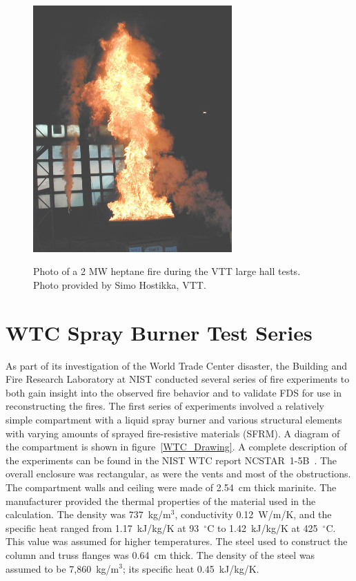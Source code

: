 \begin{figure}[\figoptions{b}]
\begin{center}
\includegraphics[width=3.0in]{FIGURES/VTT/VTT_2MW_fire}\\
\end{center}
\caption{Photo of a 2 MW heptane fire during the VTT large hall tests. Photo provided by Simo Hostikka, VTT.}
 \label{fig:VTT_2MW_fire}
\end{figure}

\clearpage

\section{WTC Spray Burner Test Series}

As part of its investigation of the World Trade Center disaster, the Building and Fire Research Laboratory at NIST conducted several series of fire experiments to both gain insight into the
observed fire behavior and to validate FDS for use in reconstructing the fires. The first series of experiments involved a relatively simple compartment with a liquid spray burner and
various structural elements with varying amounts of sprayed fire-resistive materials (SFRM). A diagram of the compartment is shown in figure~\ref{WTC_Drawing}.
A complete description of the experiments can be found in the NIST WTC report NCSTAR~1-5B~\cite{NIST_NCSTAR_1-5B}.
The overall enclosure was rectangular, as were the vents and most of the obstructions. The compartment walls and ceiling were made of 2.54~cm thick marinite. The manufacturer provided the thermal properties of the material used in the calculation. The density was 737~kg/m$^3$, conductivity 0.12~W/m/K, and the specific heat ranged from 1.17~kJ/kg/K at 93~$^\circ$C to
1.42~kJ/kg/K at 425~$^\circ$C. This value was assumed for higher temperatures.
The steel used to construct the column and truss flanges was 0.64~cm thick.  The density of the steel was assumed to be 7,860~kg/m$^3$; its specific heat 0.45~kJ/kg/K.

